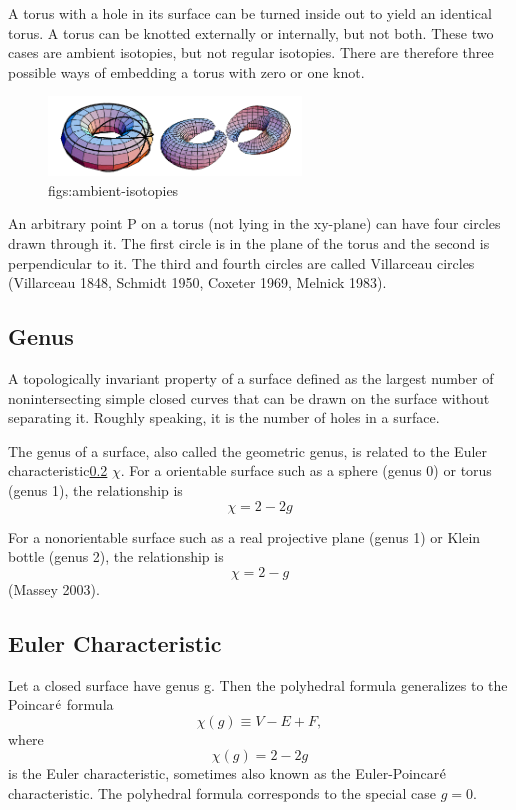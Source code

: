 \documentclass[lang=en,11pt,a4paper,cite=numbers]{elegantpaper}
\begin{document}
  A torus with a hole in its surface can be turned inside out to yield an identical torus. A torus can be knotted externally or internally, but not both. These two cases are ambient isotopies, but not regular isotopies. There are therefore three possible ways of embedding a torus with zero or one knot.
\begin{figure}[!htb]
  \centering
  \includegraphics[width=0.6\textwidth]{figs/ambient-isotopies.png}
  \caption{figs:ambient-isotopies}
  \label{figs:ambient-isotopies}
\end{figure}

  An arbitrary point P on a torus (not lying in the xy-plane) can have four circles drawn through it. The first circle is in the plane of the torus and the second is perpendicular to it. The third and fourth circles are called Villarceau circles (Villarceau 1848, Schmidt 1950, Coxeter 1969, Melnick 1983).

\subsection{Genus\cite{genus}}
\label{terms:torus-genus}
  A topologically invariant property of a surface defined as the largest number of nonintersecting simple closed curves that can be drawn on the surface without separating it. Roughly speaking, it is the number of holes in a surface.

  The genus of a surface, also called the geometric genus, is related to the Euler characteristic\ref{terms:torus-euler-characteristic} $\chi$. For a orientable surface such as a sphere (genus 0) or torus (genus 1), the relationship is
\begin{equation}
  {\chi}=2-2g
\end{equation}

  For a nonorientable surface such as a real projective plane (genus 1) or Klein bottle (genus 2), the relationship is
\begin{equation}
  {\chi}=2-g
\end{equation}
(Massey 2003).

\subsection{Euler Characteristic\cite{euler-characteristic}}
\label{terms:torus-euler-characteristic}
  Let a closed surface have genus g. Then the polyhedral formula generalizes to the Poincar$\rm{\acute{e}}$ formula
\begin{equation}
  {\chi}(g){\equiv}V-E+F,
\end{equation}
where
\begin{equation}
  {\chi}(g)=2-2g
\end{equation}
is the Euler characteristic, sometimes also known as the Euler-Poincar$\rm{\acute{e}}$ characteristic. The polyhedral formula corresponds to the special case $g=0$.
\end{document}
